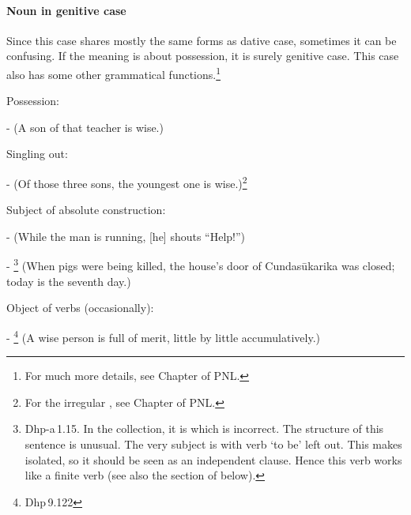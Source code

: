 \paragraph*{Noun in genitive case} Since this case shares mostly the same forms as dative case, sometimes it can be confusing. If the meaning is about possession, it is surely genitive case. This case also has some other grammatical functions.\footnote{For much more details, see Chapter  of PNL.}
\begin{compactenum}[(1)]
\item Possession:\par
-  (A son of that teacher is wise.)\par
\item Singling out:\par
-  (Of those three sons, the youngest one is wise.)\footnote{For the irregular , see Chapter  of PNL.}\par
\item Subject of absolute construction:\par
-  (While the man is running, [he] shouts ``Help!'')\par
- \footnote{Dhp-a\,1.15. In the collection, it is  which is incorrect. The structure of this sentence is unusual. The very subject is  with verb `to be' left out. This makes  isolated, so it should be seen as an independent clause. Hence this  verb works like a finite verb (see also the section of  below).} (When pigs were being killed, the house's door of Cundas\=ukarika was closed; today is the seventh day.)\par
\item Object of verbs (occasionally):\par
- \footnote{Dhp\,9.122} (A wise person is full of merit, little by little accumulatively.)\par
\end{compactenum}

